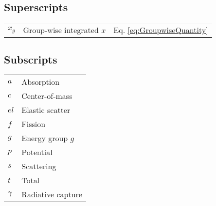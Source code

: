 \subsection{Superscripts}

\begin{tabular}{l l l}
\(x_g\) & Group-wise integrated \(x\) & Eq. \eqref{eq:GroupwiseQuantity}\\
\end{tabular}

\subsection{Subscripts}

\begin{tabular}{l l}
$a$ & Absorption\\
$c$ & Center-of-mass\\
$el$ & Elastic scatter\\
$f$ & Fission\\
$g$ & Energy group $g$\\
$p$ & Potential\\
$s$ & Scattering\\
$t$ & Total\\
$\gamma$ & Radiative capture\\
\end{tabular}
